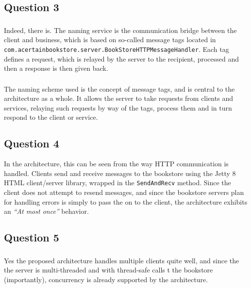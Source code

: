 \subsection{Question 3}

\subsubsection{}
Indeed, there is. The naming service is the communication bridge between the
client and business, which is based on so-called message tags located in \\
{\tt com.acertainbookstore.server.BookStoreHTTPMessageHandler}. Each tag defines
a request, which is relayed by the server to the recipient, processed and then
a response is then given back.

\subsubsection{}
The naming scheme used is the concept of message tags, and is central to the
architecture as a whole. It allows the server to take requests from clients and
services, relaying such requests by way of the tags, process them and in turn
respond to the client or service.

\subsection{Question 4}
In the architecture, this can be seen from the way HTTP communication is handled. Clients send and receive messages to the bookstore using the Jetty 8 HTML client/server library, wrapped in the {\tt SendAndRecv} method. Since the client does not attempt to resend messages, and since the bookstore servers plan for handling errors is simply to pass the on to the client, the architecture exhibits an {\it ``At most once''} behavior.

\subsection{Question 5}

\subsubsection{}
Yes the proposed architecture handles multiple clients quite well, and since the the server is multi-threaded and with thread-safe calls t the bookstore (importantly), concurrency is already supported by the architecture.

